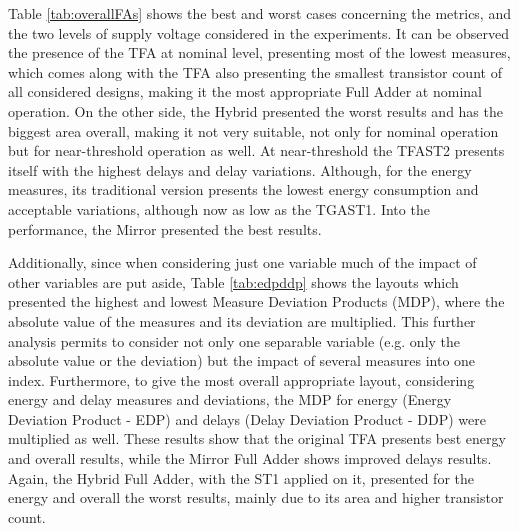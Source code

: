 \documentclass[diss,pgmicro,english]{iiufrgs}
\begin{document}
Table \ref{tab:overallFAs} shows the best and worst cases concerning the metrics, and the two levels of supply voltage considered in the experiments. It can be observed the presence of the TFA at nominal level, presenting most of the lowest measures, which comes along with the TFA also presenting the smallest transistor count of all considered designs, making it the most appropriate Full Adder at nominal operation. On the other side, the Hybrid presented the worst results and has the biggest area overall, making it not very suitable, not only for nominal operation but for near-threshold operation as well. At near-threshold the TFAST2 presents itself with the highest delays and delay variations. Although, for the energy measures, its traditional version presents the lowest energy consumption and acceptable variations, although now as low as the TGAST1. Into the performance, the Mirror presented the best results.

\begin{table}[]
\centering
\caption{Best and worst cases considering all metrics and the two types of operation considered in the experiments.}
\label{tab:overallFAs}
\end{table}

Additionally, since when considering just one variable much of the impact of other variables are put aside, Table \ref{tab:edpddp} shows the layouts which presented the highest and lowest Measure Deviation Products (MDP), where the absolute value of the measures and its deviation are multiplied. This further analysis permits to consider not only one separable variable (e.g. only the absolute value or the deviation) but the impact of several measures into one index. Furthermore, to give the most overall appropriate layout, considering energy and delay measures and deviations, the MDP for energy (Energy Deviation Product - EDP) and delays (Delay Deviation Product - DDP) were multiplied as well. These results show that the original TFA presents best energy and overall results, while the Mirror Full Adder shows improved delays results. Again, the Hybrid Full Adder, with the ST1 applied on it, presented for the energy and overall the worst results, mainly due to its area and higher transistor count.
\end{document}
